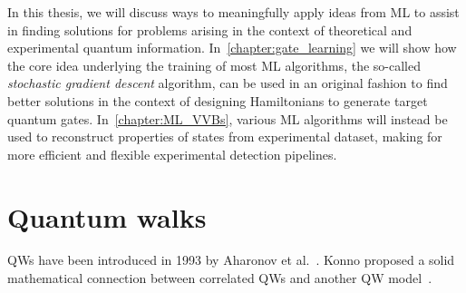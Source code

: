 In this thesis, we will discuss ways to meaningfully apply ideas from ML to assist in finding solutions for problems arising in the context of theoretical and experimental quantum information.
In~\cref{chapter:gate_learning} we will show how the core idea underlying the training of most ML algorithms, the so-called \emph{stochastic gradient descent} algorithm, can be used in an original fashion to find better solutions in the context of designing Hamiltonians to generate target quantum gates.
In~\cref{chapter:ML_VVBs}, various ML algorithms will instead be used to reconstruct properties of states from experimental dataset, making for more efficient and flexible experimental detection pipelines.


\section{Quantum walks}
\label{sec:intro:QWs}


\acp{QW} have been introduced in 1993 by Aharonov et al.~\cite{aharonov1993quantum}.
Konno proposed a solid mathematical connection between correlated \acp{QW} and another QW model~\cite{konno2003limit}.


